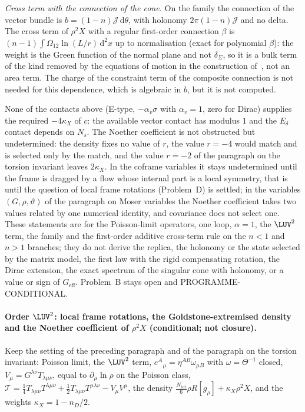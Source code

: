 \emph{Cross term with the connection of the cone.} On the family the connection of the vector bundle is \(b=(1-n)\mathcal J\,\mathrm d\theta\), with holonomy \(2\pi(1-n)\mathcal J\) and no delta. The cross term of \(\rho^2X\) with a regular first-order connection \(\beta\) is \((n-1)\int\Omega_{12}\ln(L/r)\,\mathrm d^2x\) up to normalisation (exact for polynomial \(\beta\)): the weight is the Green function of the normal plane and not \(\delta_\Sigma\), so it is a bulk term of the kind removed by the equations of motion in the construction of~\cite{LewkowyczMaldacena2013}, not an area term. The charge of the constraint term of the composite connection is not needed for this dependence, which is algebraic in \(b\), but it is not computed.

None of the contacts above (E-type, \(-\alpha_v\sigma\) with \(\alpha_v=1\), zero for Dirac) supplies the required \(-4\kappa_X\) of \(c\): the available vector contact has modulus \(1\) and the \(E_\delta\) contact depends on \(N_s\). The Noether coefficient is not obstructed but undetermined: the density fixes no value of \(r\), the value \(r=-4\) would match and is selected only by the match, and the value \(r=-2\) of the paragraph on the torsion invariant leaves \(2\kappa_X\). In the coframe variables it stays undetermined until the frame is dragged by a flow whose internal part is a local symmetry, that is until the question of local frame rotations (Problem~D) is settled; in the variables \((G,\rho,\vartheta)\) of the paragraph on Moser variables the Noether coefficient takes two values related by one numerical identity, and covariance does not select one. These statements are for the Poisson-limit operators, one loop, \(\alpha=1\), the \(\LUV^2\) term, the family and the first-order additive cross-term rule on the \(n<1\) and \(n>1\) branches; they do not derive the replica, the holonomy or the state selected by the matrix model, the first law with the rigid compensating rotation, the Dirac extension, the exact spectrum of the singular cone with holonomy, or a value or sign of \(G_{\mathrm{eff}}\). Problem~B stays open and PROGRAMME-CONDITIONAL.

\paragraph{Order \(\LUV^2\): local frame rotations, the Goldstone-extremised density and the Noether coefficient of \(\rho^2X\) (conditional; not closure).}
Keep the setting of the preceding paragraph and of the paragraph on the torsion invariant: Poisson limit, the \(\LUV^2\) term, \(e^A{}_\mu=\eta^{AB}\omega_{\mu B}\) with \(\omega=\Theta^{-1}\) closed, \(V_\mu=G^{\lambda\nu}T_{\lambda\mu\nu}\), equal to \(\partial_\mu\ln\rho\) on the Poisson class, \(\mathcal T=\tfrac14T_{\lambda\mu\nu}T^{\lambda\mu\nu}+\tfrac12T_{\lambda\mu\nu}T^{\mu\lambda\nu}-V_\mu V^\mu\), the density \(\tfrac{N_{\mathrm{tot}}}6\rho R[g_\rho]+\kappa_X\rho^2X\), and the weights \(\kappa_X=1-n_D/2\).

